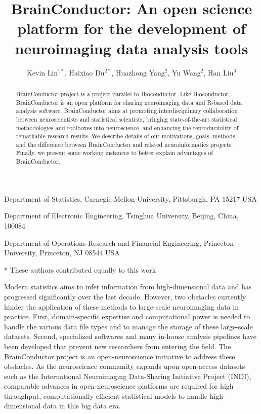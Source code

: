 \documentclass{nature}
\title{BrainConductor: An open science platform for the development of
neuroimaging
data analysis tools}
\author{Kevin Lin$^{1*}$, Haixiao Du$^{2*}$, Huazhong
Yang$^2$, Yu Wang$^2$, Han Liu$^3${\color{red}}}
\begin{document}
\maketitle



\begin{affiliations}
\item Department of Statistics, Carnegie Mellon University,
Pittsburgh, PA 15217 USA
\item Department of Electronic Engineering, Tsinghua University, Beijing, China,
100084
\item Department of Operations Research and Financial Engineering, Princeton
University, Princeton, NJ 08544 USA
\item[*] These authors contributed equally to this work
\end{affiliations}

\begin{abstract}
    BrainConductor project is a project parallel to Bioconductor. Like
Bioconductor, BrainConductor is an open platform for sharing neuroimaging data
and R-based data analysis software. BrainConductor aims at promoting
interdisciplinary collaboration between neuroscientists and
statistical scientists, bringing state-of-the-art statistical methodologies and
toolboxes into neuroscience, and enhancing the reproducibility of remarkable
research results. We describe details of our motivations, goals, methods, and
the difference between BrainConductor and related neuroinformatics projects.
Finally, we present some working instances to better explain advantages of
BrainConductor.
\end{abstract}


Modern statistics aims to infer information from high-dimensional data
and has progressed significantly over the last decade.
However, two obstacles currently hinder the
application of these methods to large-scale neuroimaging data
in practice.
First, domain-specific expertise and computational power is needed to handle
the various data file types and to manage the storage
of these large-scale datasets. Second, specialized softwares and
many in-house analysis pipelines have been developed that
prevent new researchers from entering the field.
The BrainConductor project is an open-neuroscience
initiative to address
these obstacles.
As the neuroscience community expands upon open-access
datasets such as the  International Neuroimaging Data-Sharing
Initiative Project (INDI), comparable advances in
open-neuroscience platforms are required
for high
throughput, computationally efficient statistical models
to handle high-dimensional data in this big data era.
\end{document}
